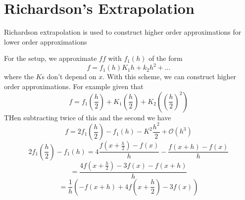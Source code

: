 \section{Richardson's Extrapolation}
\begin{definition}
    Richardson extrapolation is used to construct higher order 
    approximations for lower order approximations
\end{definition}
For the setup, we approximate \(ff\) with 
\(f_1 (h)\) of the form 
\[
    f = f_1 (h) K_1 h + k_2 h^{2}  + \dots 
\]  
where the \(K\)s don't depend on \(x\). With this scheme, 
we can construct higher order approximations. For example given that 
\[
    f = f_1 (\frac{h}{2}) + K_1 (\frac{h}{2}) + K_2 (\left( 
        \frac{h}{2}
     \right)^{2}  )
\]
THen subtracting twice of this and the second we have 
\[
    f = 2 f_1 (\frac{h}{2}) - f_1 (h) - K^{2} \frac{h^{2} }{2}
+ \mathcal{O} (h^{3})
\]
\[
    2 f_1 (\frac{h}{2}) - f_1 (h) = 
    4 \frac{f(x+\frac{h}{2}) - f(x)}{h} - 
    \frac{f(x+h) - f(x)}{h}
\]
\[
    = \frac{4 f(x+ \frac{h}{2}) - 3f(x) - f (x+h)}{h}
\]
\[
    = \frac{1}{h} \left(  -f (x+h) + 4 f(x + \frac{h}{2}) - 3f(x) \right) 
\]